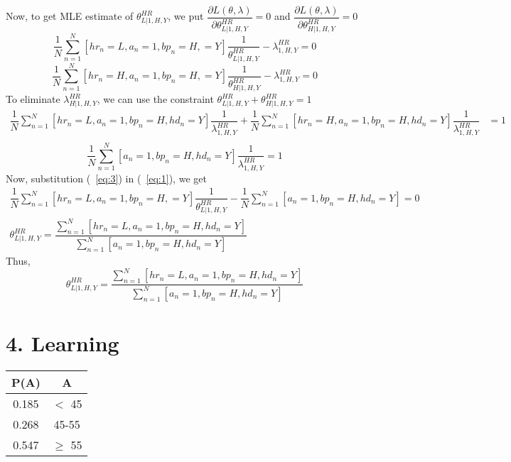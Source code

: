 \documentclass[a4paper,10pt]{report}
\begin{document}
Now, to get MLE estimate of $\theta_{L | 1, H, Y}^{HR}$, we put $\dfrac{\partial L(\theta, \lambda) }{\partial \theta_{L | 1, H, Y}^{HR} } = 0$ and $\dfrac{\partial L(\theta, \lambda) }{\partial \theta_{H | 1, H, Y}^{HR} } = 0$
\begin{equation}
 \dfrac{1}{N} \sum_{n=1}^{N} [hr_n = L, a_n = 1, bp_n = H, = Y] \dfrac{1}{\theta_{L|1, H, Y}^{HR}} - \lambda_{1, H, Y}^{HR} = 0 
 \label{eq:1}
\end{equation}
\begin{equation}
 \dfrac{1}{N} \sum_{n=1}^{N} [hr_n = H, a_n = 1, bp_n = H, = Y] \dfrac{1}{\theta_{H|1, H, Y}^{HR}} - \lambda_{1, H, Y}^{HR} = 0
 \label{eq:2}
\end{equation}
To eliminate $\lambda_{H | 1, H, Y}^{HR}$, we can use the constraint 
$\theta_{L | 1, H, Y}^{HR} + \theta_{H | 1, H, Y}^{HR} = 1$
\begin{align*}
 \dfrac{1}{N} \sum_{n=1}^{N} [hr_n = L, a_n = 1, bp_n = H, hd_n= Y] \dfrac{1}{\lambda_{1, H, Y}^{HR}} + 
 \dfrac{1}{N} \sum_{n=1}^{N} [hr_n = H, a_n = 1, bp_n = H, hd_n= Y] \dfrac{1}{\lambda_{1, H, Y}^{HR}} &= 1 \\
\end{align*}
\begin{equation}
 \dfrac{1}{N} \sum_{n=1}^{N} [a_n=1, bp_n = H, hd_n = Y] \dfrac{1}{\lambda_{1, H, Y}^{HR} } = 1
 \label{eq:3}
\end{equation}
Now, substitution (~\ref{eq:3}) in (~\ref{eq:1}), we get
\begin{align*}
 \dfrac{1}{N} \sum_{n=1}^{N} [hr_n = L, a_n = 1, bp_n = H, = Y] \dfrac{1}{\theta_{L|1, H, Y}^{HR}} - \dfrac{1}{N} \sum_{n=1}^{N} [a_n=1, bp_n = H, hd_n = Y] = 0  \\
 \theta_{L | 1, H, Y }^{HR} = \dfrac{\sum_{n=1}^{N} [hr_n = L, a_n = 1, bp_n = H, hd_n= Y] }{\sum_{n=1}^{N} [a_n = 1, bp_n = H, hd_n= Y] }
\end{align*}
Thus,
\begin{equation*}
 \boxed{\theta_{L | 1, H, Y }^{HR} = \dfrac{\sum_{n=1}^{N} [hr_n = L, a_n = 1, bp_n = H, hd_n= Y] }{\sum_{n=1}^{N} [a_n = 1, bp_n = H, hd_n= Y] } }
\end{equation*}


\section*{4. Learning}
\vspace{1em}
\begin{tabular}{|c|c|}\hline
P(A) & A  \\ \hline\hline
0.185 & $<$ 45 \\ \hline
0.268 & 45-55  \\ \hline
0.547 & $\ge$ 55 \\ \hline
\end{tabular}
\vspace{1em}
\end{document}
